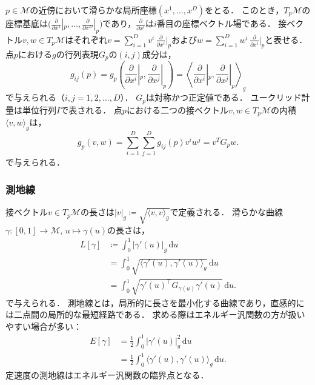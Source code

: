 \documentclass[MIRU,submit]{miru2026j}
\theoremstyle{definition}
\newcommand{\gM}{{\mathcal{M}}}
\newcommand{\dee}{{\mathrm{d}}}
\begin{document}
$p\in\gM$の近傍において滑らかな局所座標$(x^1,\dots,x^D)$をとる．
このとき，$T_p\gM$の座標基底は$\bigl(\frac{\partial}{\partial x^1}|_p,\dots,\frac{\partial}{\partial x^D}|_p\bigr)$であり，$\frac{\partial}{\partial x^i}$は$i$番目の座標ベクトル場である．
接ベクトル$v,w\in T_p{\gM}$はそれぞれ$v=\sum_{i=1}^D v^i\,\frac{\partial}{\partial x^i}|_p$および$w=\sum_{i=1}^D w^i\,\frac{\partial}{\partial x^i}|_p$と表せる．
点$p$における$g$の行列表現$G_p$の$(i,j)$成分は，
\begin{equation}
    \label{eq:metric_tensor}
    \textstyle
    g_{ij}(p)=g_p\left(\frac{\partial}{\partial x^i}|_p,\frac{\partial}{\partial x^j}|_p\right)=\left\langle \frac{\partial}{\partial x^i}|_p,\frac{\partial}{\partial x^j}|_p \right\rangle_g
\end{equation}
で与えられる（$i,j=1,2,...,D$）．
$G_p$は対称かつ正定値である．
ユークリッド計量は単位行列$I$で表される．
点$p$における二つの接ベクトル$v,w\in T_p\gM$の内積$\langle v,w\rangle_g$は，
\begin{equation}
    \label{eq:inner_product_with_metric_tensor}
    \textstyle
    g_p(v,w)=\sum_{i=1}^D\sum_{j=1}^D g_{ij}(p)v^iw^j=v^TG_pw.
\end{equation}
で与えられる．

\subsubsection{測地線}
接ベクトル$v\in T_p\gM$の長さは$|v|_g \coloneq \sqrt{\langle v,v\rangle_g}$で定義される．
滑らかな曲線$\gamma:[0,1]\to \gM,\,u\mapsto \gamma(u)$の長さは，
\begin{equation}
    \label{eq:length_functional}
    \begin{aligned}
        \textstyle L[\gamma]
         & \textstyle \coloneq \int_0^1 |\gamma'(u)|_g \,\dee u \\
         & \textstyle = \int_0^1 \sqrt{\langle \gamma'(u), \gamma'(u)\rangle_g}\,\dee u \\
         & \textstyle = \int_0^1 \sqrt{\gamma'(u)^\top G_{\gamma(u)} \gamma'(u)} \,\dee u.
    \end{aligned}
\end{equation}
で与えられる．
測地線とは，局所的に長さを最小化する曲線であり，直感的には二点間の局所的な最短経路である．
求める際はエネルギー汎関数の方が扱いやすい場合が多い：
\begin{equation}
    \label{eq:energy_functional}
    \begin{aligned}
    \textstyle
        E[\gamma]
        &= \textstyle\frac{1}{2} \int_0^1 |\gamma'(u)|_g^2 \,\dee u \\
        &= \textstyle\frac{1}{2} \int_0^1 \langle \gamma'(u), \gamma'(u) \rangle_g \,\dee u. 
    \end{aligned}
\end{equation}
定速度の測地線はエネルギー汎関数の臨界点となる．
\end{document}
